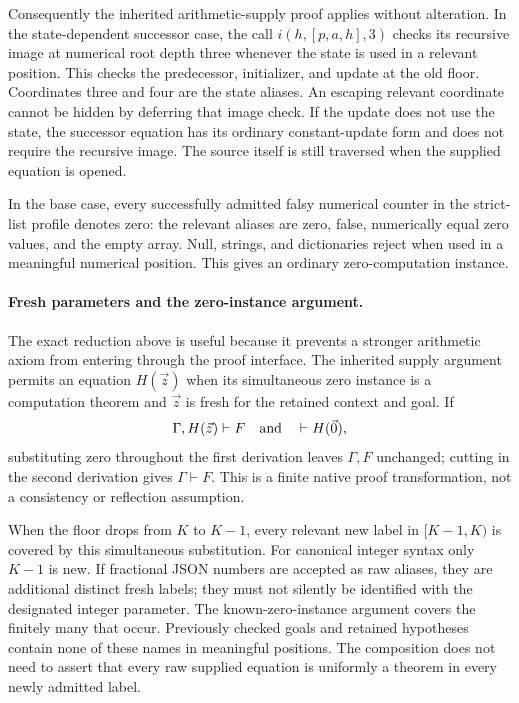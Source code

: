 Consequently the inherited arithmetic-supply proof applies without
alteration.  In the state-dependent successor case, the call
$i(h,[p,a,h],3)$ checks its recursive image at numerical root depth
three whenever the state is used in a relevant position.  This checks
the predecessor, initializer, and update at the old floor.  Coordinates
three and four are the state aliases.  An escaping relevant coordinate
cannot be hidden by deferring that image check.  If the update does not
use the state, the successor equation has its ordinary constant-update
form and does not require the recursive image.  The source itself is
still traversed when the supplied equation is opened.

In the base case, every successfully admitted falsy numerical counter
in the strict-list profile denotes zero: the relevant aliases are zero,
false, numerically equal zero values, and the empty array.  Null,
strings, and dictionaries reject when used in a meaningful numerical
position.  This gives an ordinary zero-computation instance.

\paragraph{Fresh parameters and the zero-instance argument.}
The exact reduction above is useful because it prevents a stronger
arithmetic axiom from entering through the proof interface.  The
inherited supply argument permits an equation $H(\vec z)$ when its
simultaneous zero instance is a computation theorem and $\vec z$ is
fresh for the retained context and goal.  If
\[
 \Gamma,H(\vec z)\vdash F\quad\hbox{and}\quad\vdash H(\vec0),
\]
substituting zero throughout the first derivation leaves $\Gamma,F$
unchanged; cutting in the second derivation gives $\Gamma\vdash F$.
This is a finite native proof transformation, not a consistency or
reflection assumption.

When the floor drops from $K$ to $K-1$, every relevant new label in
$[K-1,K)$ is covered by this simultaneous substitution.  For canonical
integer syntax only $K-1$ is new.  If fractional JSON numbers are
accepted as raw aliases, they are additional distinct fresh labels;
they must not silently be identified with the designated integer
parameter.  The known-zero-instance argument covers the finitely many
that occur.  Previously checked goals and retained hypotheses contain
none of these names in meaningful positions.  The composition does not
need to assert that every raw supplied equation is uniformly a theorem
in every newly admitted label.

